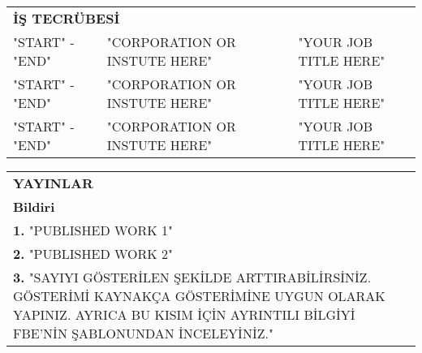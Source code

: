 \documentclass[12pt]{report}
\begin{document}
\begin{table}[!ht]
\begin{tabular}{l p{9.5cm} l}
\multicolumn{3}{l}{\bfseries{İŞ TECRÜBESİ}}\\[2ex]
"START" - "END" & "CORPORATION OR INSTUTE HERE" & "YOUR JOB TITLE HERE" \\[2ex]
"START" - "END" & "CORPORATION OR INSTUTE HERE" & "YOUR JOB TITLE HERE" \\[2ex]
"START" - "END" & "CORPORATION OR INSTUTE HERE" & "YOUR JOB TITLE HERE" \\[5ex]
\end{tabular}
\begin{tabular}{p{15.5cm}}

\bfseries{YAYINLAR} \\[2ex]
\bfseries{Bildiri} \\[2ex]
\textbf{1.} "PUBLISHED WORK 1"\\[2ex]
\textbf{2.} "PUBLISHED WORK 2"\\[2ex]
\textbf{3.} "SAYIYI GÖSTERİLEN ŞEKİLDE ARTTIRABİLİRSİNİZ. GÖSTERİMİ KAYNAKÇA GÖSTERİMİNE UYGUN OLARAK YAPINIZ. AYRICA BU KISIM İÇİN AYRINTILI BİLGİYİ FBE'NİN ŞABLONUNDAN İNCELEYİNİZ."\\[5ex]
\end{tabular}
\end{table}
\end{document}
